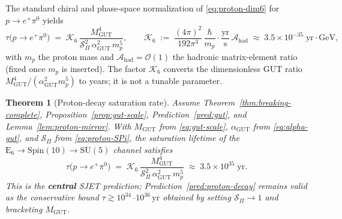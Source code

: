 \documentclass[aps,prd,onecolumn,amsmath,amssymb,nofootinbib,11pt]{revtex4-2}
\numberwithin{equation}{section}
\theoremstyle{plain}
\newtheorem{theorem}{Theorem}[section]
\theoremstyle{definition}
\theoremstyle{remark}
\newcommand{\E}[1]{\mathrm{E}_{#1}}
\newcommand{\Spin}{\mathrm{Spin}}
\begin{document}
The standard chiral and phase-space normalization of \eqref{eq:proton-dim6}
for $p\to e^+\pi^0$ yields~\cite{GeorgiGlashow1974,Witten1985}
\begin{equation}\label{eq:proton-rate}
  \tau\!\bigl(p\to e^+\pi^0\bigr)
  \;=\;
  \mathcal{K}_{6}\,
  \frac{M_{\mathrm{GUT}}^{4}}
       {\mathcal{S}_\Pi^{2}\,\alpha_{\mathrm{GUT}}^{2}\,m_{p}^{5}},
  \qquad
  \mathcal{K}_{6}
  \;:=\;
  \frac{(4\pi)^2}{192\pi^3}\,
  \frac{\hbar}{m_{p}}\cdot\frac{\mathrm{yr}}{\mathrm{s}}\,
  \mathcal{A}_{\mathrm{had}}
  \;\approx\;
  3.5\times 10^{-35}\;\mathrm{yr\cdot GeV},
\end{equation}
with $m_p$ the proton mass and $\mathcal{A}_{\mathrm{had}}=\mathcal{O}(1)$ the
hadronic matrix-element ratio (fixed once $m_p$ is inserted). The factor
$\mathcal{K}_{6}$ converts the dimensionless GUT ratio
$M_{\mathrm{GUT}}^{4}/(\alpha_{\mathrm{GUT}}^{2}m_{p}^{5})$ to years; it is
not a tunable parameter.

\begin{theorem}[Proton-decay saturation rate]\label{thm:proton-decay-rate}
Assume Theorem~\ref{thm:breaking-complete},
Proposition~\ref{prop:gut-scale}, Prediction~\ref{pred:gut}, and
Lemma~\ref{lem:proton-mirror}. With $M_{\mathrm{GUT}}$ from
\eqref{eq:gut-scale}, $\alpha_{\mathrm{GUT}}$ from \eqref{eq:alpha-gut}, and
$\mathcal{S}_\Pi$ from \eqref{eq:proton-SPi}, the saturation lifetime of the
$\E{6}\to\Spin(10)\to\mathrm{SU}(5)$ channel satisfies
\begin{equation}\label{eq:proton-tau-sat}
  \tau\!\bigl(p\to e^+\pi^0\bigr)
  \;=\;
  \mathcal{K}_{6}\,
  \frac{M_{\mathrm{GUT}}^{4}}
       {\mathcal{S}_\Pi^{2}\,\alpha_{\mathrm{GUT}}^{2}\,m_{p}^{5}}
  \;\approx\;
  3.5\times 10^{35}\;\mathrm{yr}.
\end{equation}
This is the \textbf{central} SJET prediction; Prediction~\ref{pred:proton-decay}
remains valid as the conservative bound
$\tau\gtrsim 10^{34}$--$10^{36}\,\mathrm{yr}$ obtained by setting
$\mathcal{S}_\Pi\to 1$ and bracketing $M_{\mathrm{GUT}}$.
\end{theorem}
\end{document}
